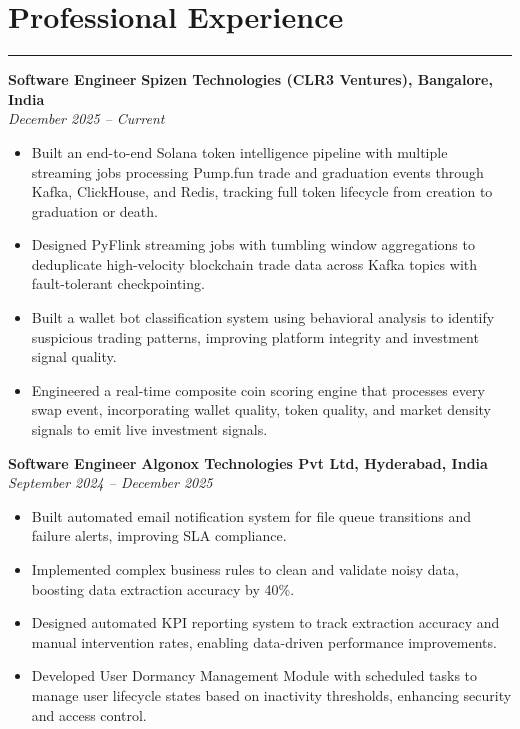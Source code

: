 \documentclass[12pt]{article}
\begin{document}
\section*{Professional Experience}
\vspace{1pt}\hrule\vspace{4pt}

\textbf{Software Engineer} \hfill \textbf{Spizen Technologies (CLR3 Ventures), Bangalore, India} \\
\textit{December 2025 -- Current}
\begin{itemize}
  \item Built an end-to-end Solana token intelligence pipeline with multiple streaming jobs processing Pump.fun trade and graduation events through Kafka, ClickHouse, and Redis, tracking full token lifecycle from creation to graduation or death.
  \item Designed PyFlink streaming jobs with tumbling window aggregations to deduplicate high-velocity blockchain trade data across Kafka topics with fault-tolerant checkpointing.
  \item Built a wallet bot classification system using behavioral analysis to identify suspicious trading patterns, improving platform integrity and investment signal quality.
  \item Engineered a real-time composite coin scoring engine that processes every swap event, incorporating wallet quality, token quality, and market density signals to emit live investment signals.
\end{itemize}

\textbf{Software Engineer} \hfill \textbf{Algonox Technologies Pvt Ltd, Hyderabad, India} \\
\textit{September 2024 -- December 2025}
\begin{itemize}
  \item Built automated email notification system for file queue transitions and failure alerts, improving SLA compliance.
  \item Implemented complex business rules to clean and validate noisy data, boosting data extraction accuracy by 40\%.
  \item Designed automated KPI reporting system to track extraction accuracy and manual intervention rates, enabling data-driven performance improvements.
  \item Developed User Dormancy Management Module with scheduled tasks to manage user lifecycle states based on inactivity thresholds, enhancing security and access control.
\end{itemize}
\end{document}
